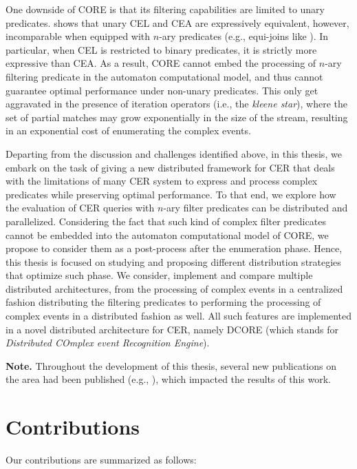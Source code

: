 One downside of CORE is that its filtering capabilities are limited to unary predicates. \cite{on-the-expressiveness} shows that unary CEL and CEA are expressively equivalent, however, incomparable when equipped with $n$-ary predicates (e.g., equi-joins like ). In particular, when CEL is restricted to binary predicates, it is strictly more expressive than CEA. As a result, CORE cannot embed the processing of $n$-ary filtering predicate in the automaton computational model, and thus cannot guarantee optimal performance under non-unary predicates. This only get aggravated in the presence of iteration operators (i.e., the \emph{kleene star}), where the set of partial matches may grow exponentially in the size of the stream, resulting in an exponential cost of enumerating the complex events.

Departing from the discussion and challenges identified above, in this thesis, we embark on the task of giving a new distributed framework for CER that deals with the limitations of many CER system to express and process complex predicates while preserving optimal performance. To that end, we explore how the evaluation of CER queries with $n$-ary filter predicates can be distributed and parallelized. Considering the fact that such kind of complex filter predicates cannot be embedded into the automaton computational model of CORE, we propose to consider them as a post-process after the enumeration phase. Hence, this thesis is focused on studying and proposing different distribution strategies that optimize such phase. We consider, implement and compare multiple distributed architectures, from the processing of complex events in a centralized fashion distributing the filtering predicates to performing the processing of complex events in a distributed fashion as well. All such features are implemented in a novel distributed architecture for CER, namely DCORE (which stands for \emph{Distributed COmplex event Recognition Engine}).

\textbf{Note.} Throughout the development of this thesis, several new publications on the area had been published (e.g., \cite{formal-framework-cer, core}), which impacted the results of this work.

\section{Contributions}\label{sec:contribution}

Our contributions are summarized as follows:

